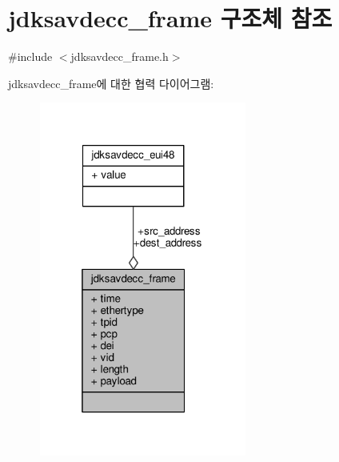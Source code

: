 \hypertarget{structjdksavdecc__frame}{}\section{jdksavdecc\+\_\+frame 구조체 참조}
\label{structjdksavdecc__frame}


{\ttfamily \#include $<$jdksavdecc\+\_\+frame.\+h$>$}



jdksavdecc\+\_\+frame에 대한 협력 다이어그램\+:
\nopagebreak
\begin{figure}[H]
\begin{center}
\leavevmode
\includegraphics[width=193pt]{structjdksavdecc__frame__coll__graph}
\end{center}
\end{figure}
